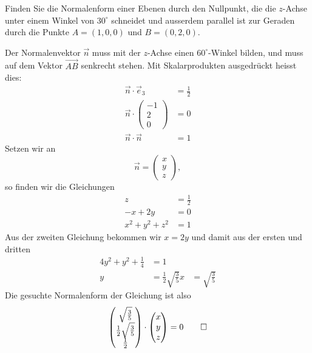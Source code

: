 Finden Sie die Normalenform einer Ebenen durch den
Nullpunkt, die die $z$-Achse
unter einem Winkel von $30^\circ$ schneidet und ausserdem
parallel ist zur Geraden durch die Punkte $A=(1,0,0)$ und
$B=(0,2,0)$.

\begin{loesung}
Der Normalenvektor $\vec n$ muss mit der $z$-Achse einen $60^\circ$-Winkel
bilden, und muss auf dem Vektor $\overrightarrow{AB}$ senkrecht stehen.
Mit Skalarprodukten ausgedrückt heisst dies:
\begin{align*}
\vec n\cdot \vec e_3&=\frac12\\
\vec n\cdot \begin{pmatrix}-1\\2\\0\end{pmatrix}&=0\\
\vec n\cdot\vec n&=1
\end{align*}
Setzen wir an
\[
\vec n =
\begin{pmatrix}x\\y\\z\end{pmatrix},
\]
so finden wir die Gleichungen
\begin{align*}
z&= \frac12\\
-x+2y&=0\\
x^2+y^2+z^2&=1
\end{align*}
Aus der zweiten Gleichung bekommen wir $x=2y$ und damit aus der ersten
und dritten
\begin{align*}
4y^2+y^2+\frac14&=1
\\
y&=\frac12\sqrt{\frac35}
x&=\sqrt{\frac35}
\end{align*}
Die gesuchte Normalenform der Gleichung ist also
\[
\begin{pmatrix}
\sqrt{\frac35}\\
\frac12\sqrt{\frac35}\\
\frac12
\end{pmatrix}\cdot \begin{pmatrix}x\\y\\z\end{pmatrix} =0
\qedhere
\]
\end{loesung}

